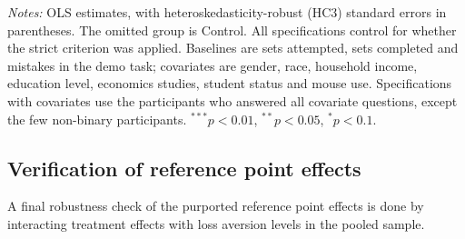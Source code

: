 \documentclass[12pt, letterpaper]{article}
\begin{document}
\begin{table}
\centering
\begin{threeparttable}

\begin{tablenotes}[flushleft]
\footnotesize
\item \textit{Notes:} OLS estimates, with heteroskedasticity-robust (HC3) standard errors in parentheses. The omitted group is Control. All specifications control for whether the strict criterion was applied. Baselines are sets attempted, sets completed and mistakes in the demo task; covariates are gender, race, household income, education level, economics studies, student status and mouse use. Specifications with covariates use the participants who answered all covariate questions, except the few non-binary participants. $^{***}p<0.01$, $^{**}p<0.05$, $^{*}p<0.1$.
\end{tablenotes}
\end{threeparttable}
\caption{Treatment effects on sets completed (pooled sample)}\label{tab:reg-sets}
\end{table}

\subsection{Verification of reference point effects}

A final robustness check of the purported reference point effects is done by interacting treatment effects with loss aversion levels in the pooled sample.
\end{document}
